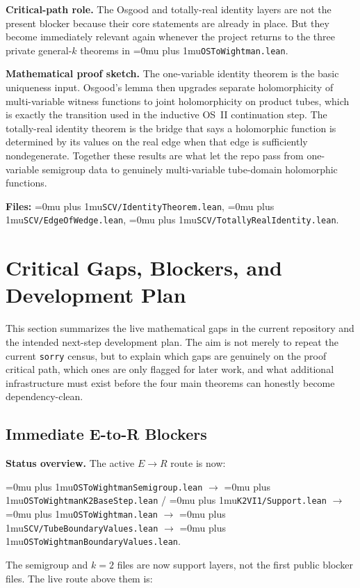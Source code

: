\documentclass[11pt,a4paper]{article}
\newcommand{\sorry}{\texttt{sorry}}
\newcommand{\leanfile}[1]{\begingroup\Urlmuskip=0mu plus 1mu\relax\nolinkurl{#1}\endgroup}
\newcommand{\leanname}[1]{\begingroup\Urlmuskip=0mu plus 1mu\relax\nolinkurl{#1}\endgroup}
\begin{document}
\medskip\noindent
\textbf{Critical-path role.}
The Osgood and totally-real identity layers are not the present blocker because
their core statements are already in place. But they become immediately relevant
again whenever the project returns to the three private general-$k$ theorems in
\leanfile{OSToWightman.lean}.

\medskip\noindent
\textbf{Mathematical proof sketch.}
The one-variable identity theorem is the basic uniqueness input. Osgood's lemma
then upgrades separate holomorphicity of multi-variable witness functions to
joint holomorphicity on product tubes, which is exactly the transition used in
the inductive OS~II continuation step. The totally-real identity theorem is the
bridge that says a holomorphic function is determined by its values on the real
edge when that edge is sufficiently nondegenerate. Together these results are
what let the repo pass from one-variable semigroup data to genuinely
multi-variable tube-domain holomorphic functions.

\textbf{Files:} \leanname{SCV/IdentityTheorem.lean},
\leanname{SCV/EdgeOfWedge.lean}, \leanname{SCV/TotallyRealIdentity.lean}.


\section{Critical Gaps, Blockers, and Development Plan}

This section summarizes the live mathematical gaps in the current repository and
the intended next-step development plan. The aim is not merely to repeat the
current \sorry{} census, but to explain which gaps are genuinely on the proof
critical path, which ones are only flagged for later work, and what additional
infrastructure must exist before the four main theorems can honestly become
dependency-clean.

\subsection{Immediate E-to-R Blockers}

\textbf{Status overview.}
The active $E \to R$ route is now:
\begin{center}
\leanfile{OSToWightmanSemigroup.lean}
$\to$
\leanfile{OSToWightmanK2BaseStep.lean} / \leanfile{K2VI1/Support.lean}
$\to$
\leanfile{OSToWightman.lean}
$\to$
\leanfile{SCV/TubeBoundaryValues.lean}
$\to$
\leanfile{OSToWightmanBoundaryValues.lean}.
\end{center}
The semigroup and $k=2$ files are now support layers, not the first public
blocker files. The live route above them is:
\end{document}
